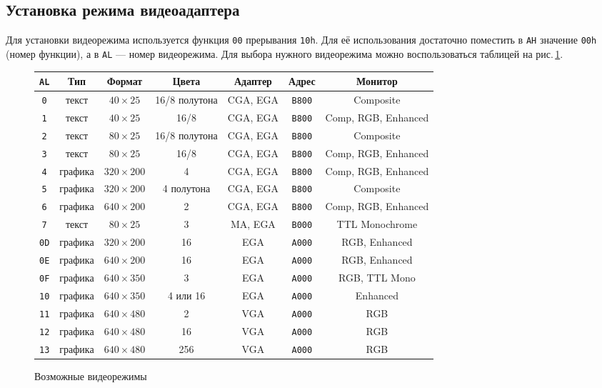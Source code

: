 \documentclass[a4paper,12pt,notitlepage,pdftex,headsepline]{scrartcl}
\begin{document}
\subsection{Установка режима видеоадаптера}
Для установки видеорежима используется функция \texttt{00} прерывания \texttt{10h}.
Для её использования достаточно поместить в \texttt{AH} значение \texttt{00h} (номер функции), а в \texttt{AL} --- номер видеорежима.
Для выбора нужного видеорежима можно воспользоваться таблицей на рис.\,\ref{videomodes}.

\begin{figure}[!t]
\normalsize
\begin{tabular}{|c||c|c|c|c|c|c|}
\hline \rule[-2ex]{0pt}{5.5ex} \texttt{AL} & Тип & Формат & Цвета & Адаптер & Адрес & Монитор \\ 
\hline\hline \rule[-2ex]{0pt}{5.5ex} \texttt{0} & текст & $40\times25$ & 16/8 полутона & CGA, EGA & \texttt{B800} & Composite \\ 
\hline \rule[-2ex]{0pt}{5.5ex} \texttt{1} & текст & $40\times25$ & 16/8 & CGA, EGA & \texttt{B800} & Comp, RGB, Enhanced \\ 
\hline \rule[-2ex]{0pt}{5.5ex} \texttt{2} & текст & $80\times25$ & 16/8 полутона & CGA, EGA & \texttt{B800} & Composite \\ 
\hline \rule[-2ex]{0pt}{5.5ex} \texttt{3} & текст & $80\times25$ & 16/8 & CGA, EGA & \texttt{B800} & Comp, RGB, Enhanced \\ 
\hline \rule[-2ex]{0pt}{5.5ex} \texttt{4} & графика & $320\times200$ & 4 & CGA, EGA & \texttt{B800} & Comp, RGB, Enhanced \\ 
\hline \rule[-2ex]{0pt}{5.5ex} \texttt{5} & графика & $320\times200$ & 4 полутона & CGA, EGA & \texttt{B800} & Composite \\ 
\hline \rule[-2ex]{0pt}{5.5ex} \texttt{6} & графика & $640\times200$ & 2 & CGA, EGA & \texttt{B800} & Comp, RGB, Enhanced \\ 
\hline \rule[-2ex]{0pt}{5.5ex} \texttt{7} & текст & $80\times25$ & 3 & MA, EGA & \texttt{B000} & TTL Monochrome \\ 
\hline \rule[-2ex]{0pt}{5.5ex} \texttt{0D} & графика & $320\times200$ & 16 & EGA & \texttt{A000} & RGB, Enhanced \\ 
\hline \rule[-2ex]{0pt}{5.5ex} \texttt{0E} & графика & $640\times200$ & 16 & EGA & \texttt{A000} & RGB, Enhanced \\ 
\hline \rule[-2ex]{0pt}{5.5ex} \texttt{0F} & графика & $640\times350$ & 3 & EGA & \texttt{A000} & RGB, TTL Mono \\ 
\hline \rule[-2ex]{0pt}{5.5ex} \texttt{10} & графика & $640\times350$ & 4 или 16 & EGA & \texttt{A000} & Enhanced \\ 
\hline \rule[-2ex]{0pt}{5.5ex} \texttt{11} & графика & $640\times480$ & 2 & VGA & \texttt{A000} & RGB \\ 
\hline \rule[-2ex]{0pt}{5.5ex} \texttt{12} & графика & $640\times480$ & 16 & VGA & \texttt{A000} & RGB \\ 
\hline \rule[-2ex]{0pt}{5.5ex} \texttt{13} & графика & $640\times480$ & 256 & VGA & \texttt{A000} & RGB \\ 
\hline 
\end{tabular} 
\caption{Возможные видеорежимы}
\label{videomodes}
\end{figure}
\end{document}
